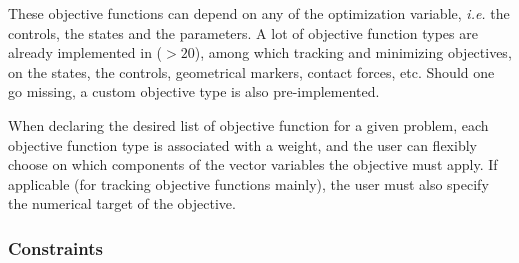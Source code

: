 These objective functions can depend on any of the optimization variable, \textit{i.e.} the controls, the states and the parameters. A lot of objective function types are already implemented in \bioptim ($>20$), among which tracking and minimizing objectives, on the states, the controls, geometrical markers, contact forces, etc. Should one go missing, a custom objective type is also pre-implemented.

When declaring the desired list of objective function for a given problem, each objective function type is associated with a weight, and the user can flexibly choose on which components of the vector variables the objective must apply. If applicable (for tracking objective functions mainly), the user must also specify the numerical target of the objective.

\subsubsection{Constraints}